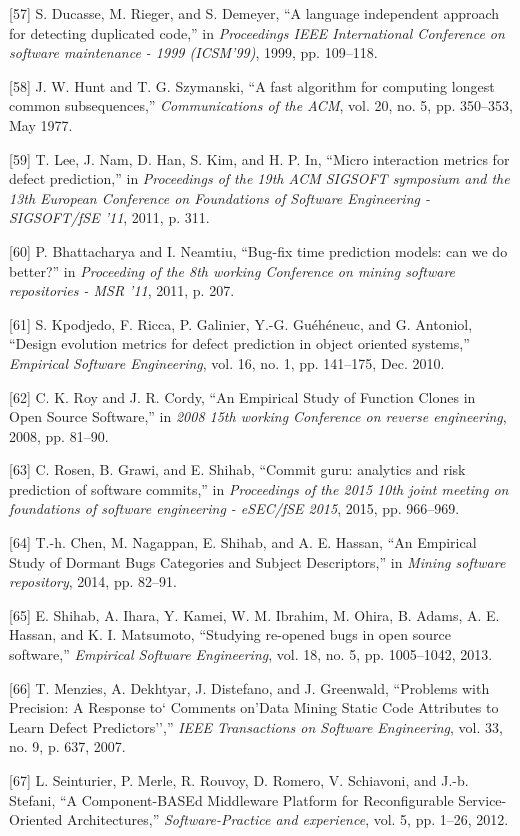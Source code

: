 {[}57{]} S. Ducasse, M. Rieger, and S. Demeyer, ``A language independent
approach for detecting duplicated code,'' in \emph{Proceedings IEEE
International Conference on software maintenance - 1999 (ICSM'99)}, 1999,
pp. 109--118.

{[}58{]} J. W. Hunt and T. G. Szymanski, ``A fast algorithm for
computing longest common subsequences,'' \emph{Communications of the
ACM}, vol. 20, no. 5, pp. 350--353, May 1977.

{[}59{]} T. Lee, J. Nam, D. Han, S. Kim, and H. P. In, ``Micro
interaction metrics for defect prediction,'' in \emph{Proceedings of the
19th ACM SIGSOFT symposium and the 13th European Conference on
Foundations of Software Engineering - SIGSOFT/fSE '11}, 2011, p. 311.

{[}60{]} P. Bhattacharya and I. Neamtiu, ``Bug-fix time prediction
models: can we do better?'' in \emph{Proceeding of the 8th working
Conference on mining software repositories - MSR '11}, 2011, p. 207.

{[}61{]} S. Kpodjedo, F. Ricca, P. Galinier, Y.-G. Gu{é}h{é}neuc, and G.
Antoniol, ``Design evolution metrics for defect prediction in object
oriented systems,'' \emph{Empirical Software Engineering}, vol. 16, no.
1, pp. 141--175, Dec. 2010.

{[}62{]} C. K. Roy and J. R. Cordy, ``An Empirical Study of Function
Clones in Open Source Software,'' in \emph{2008 15th working Conference
on reverse engineering}, 2008, pp. 81--90.

{[}63{]} C. Rosen, B. Grawi, and E. Shihab, ``Commit guru: analytics and
risk prediction of software commits,'' in \emph{Proceedings of the 2015
10th joint meeting on foundations of software engineering - eSEC/fSE
2015}, 2015, pp. 966--969.

{[}64{]} T.-h. Chen, M. Nagappan, E. Shihab, and A. E. Hassan, ``An
Empirical Study of Dormant Bugs Categories and Subject Descriptors,'' in
\emph{Mining software repository}, 2014, pp. 82--91.

{[}65{]} E. Shihab, A. Ihara, Y. Kamei, W. M. Ibrahim, M. Ohira, B.
Adams, A. E. Hassan, and K. I. Matsumoto, ``Studying re-opened bugs in
open source software,'' \emph{Empirical Software Engineering}, vol. 18,
no. 5, pp. 1005--1042, 2013.

{[}66{]} T. Menzies, A. Dekhtyar, J. Distefano, and J. Greenwald,
``Problems with Precision: A Response to` Comments on'Data Mining Static
Code Attributes to Learn Defect Predictors'','' \emph{IEEE Transactions
on Software Engineering}, vol. 33, no. 9, p. 637, 2007.

{[}67{]} L. Seinturier, P. Merle, R. Rouvoy, D. Romero, V. Schiavoni,
and J.-b. Stefani, ``A Component-BASEd Middleware Platform for
Reconfigurable Service-Oriented Architectures,'' \emph{Software-Practice
and experience}, vol. 5, pp. 1--26, 2012.

